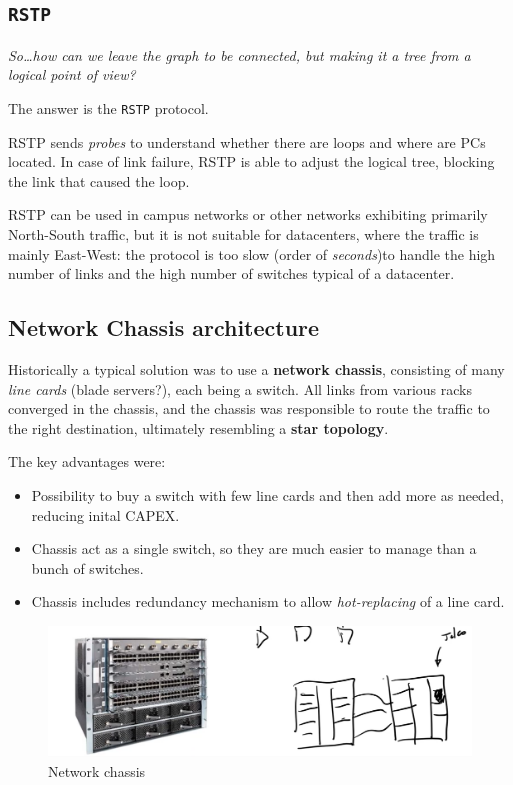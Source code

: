 \subsection{\texttt{RSTP}}
\begin{center}
   \textit{So\dots how can we leave the graph to be connected, but making it a tree from a logical point of view?}

   The answer is the \texttt{RSTP} protocol.
\end{center}

RSTP sends \textit{probes} to understand whether there are loops and where are PCs located.
In case of link failure, RSTP is able to adjust the logical tree, blocking the link that caused the loop.

RSTP can be used in campus networks or other networks exhibiting primarily North-South traffic, but it is not suitable for datacenters, where the traffic is mainly East-West:
the protocol is too slow (order of \textit{seconds})to handle the high number of links and the high number of switches typical of a datacenter.

\subsection{Network Chassis architecture}

\begin{paracol}{2}
   
   Historically a typical solution was to use a \textbf{network chassis}, consisting of many \textit{line cards} (blade servers?), each being a switch.
   All links from various racks converged in the chassis, and the chassis was responsible to route the traffic to the right destination, ultimately resembling a \textbf{star topology}.
   
   The key advantages were:
   \begin{itemize}
      \item Possibility to buy a switch with few line cards and then add more as needed, reducing inital CAPEX.
      \item Chassis act as a single switch, so they are much easier to manage than a bunch of switches. 
      \item Chassis includes redundancy mechanism to allow \textit{hot-replacing} of a line card.
   \end{itemize}
   
   \switchcolumn
   
   \begin{figure}[htbp]
      \centering
      \includegraphics{images/network_chassis.png}
      \caption{Network chassis}
      \label{fig:network_chassis}
   \end{figure}

\end{paracol}
   
